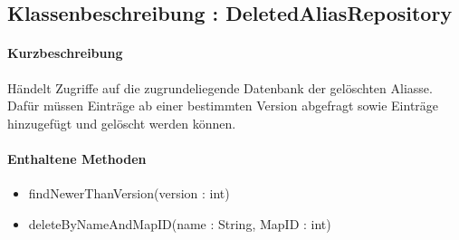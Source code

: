 \subsection{Klassenbeschreibung : DeletedAliasRepository}%
\paragraph*{Kurzbeschreibung}
Händelt Zugriffe auf die zugrundeliegende Datenbank der gelöschten Aliasse.
Dafür müssen Einträge ab einer bestimmten Version abgefragt sowie Einträge hinzugefügt und gelöscht werden können.
\paragraph*{Enthaltene Methoden}
\begin{itemize}
    \item findNewerThanVersion(version : int)
    \item deleteByNameAndMapID(name : String, MapID : int)
\end{itemize}